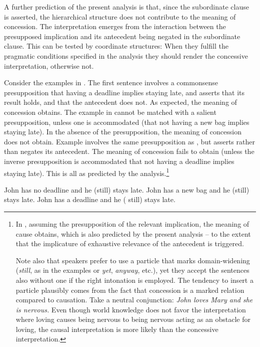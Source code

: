 \documentclass[output=paper]{langscibook}
\begin{document}
\noindent A further prediction of the present analysis is that, since the subordinate clause is asserted, the hierarchical structure does not contribute to the meaning of concession. The interpretation emerges from the interaction between the presupposed implication and its antecedent being negated in the subordinate clause. This can be tested by coordinate structures: When they fulfill the pragmatic conditions
specified in the analysis they should render the concessive interpretation, otherwise not.

Consider the examples in . The first sentence involves a commonsense presupposition that having a deadline implies staying late, and asserts that its result holds, and that the antecedent does not. As expected, the meaning of concession obtains. The example in  cannot be matched with a salient presupposition, unless one is accommodated (that not having a new bag implies staying late). In the absence of the presupposition, the meaning of concession does not obtain. Example  involves the same presupposition as , but asserts rather than negates its antecedent. The meaning of concession fails to obtain (unless the inverse presupposition is accommodated that not having a deadline implies staying late). This is all as predicted by the analysis.\footnote{In , assuming the presupposition of the relevant implication, the meaning of cause obtains, which is also predicted by the present analysis -- to the extent that the implicature of exhaustive relevance of the antecedent is triggered.

Note also that speakers prefer to use a particle that marks domain-widening (\textit{still}, as in the examples or \textit{yet}, \textit{anyway}, etc.), yet they accept the sentences also without one if the right intonation is employed. The tendency to insert a particle plausibly comes from the fact that concession is a marked relation compared to causation. Take a neutral conjunction: \textit{John loves Mary and she is nervous.} Even though world knowledge does not favor the interpretation where loving causes being nervous to being nervous acting as an obstacle for loving, the causal interpretation is more likely than the concessive interpretation.}

\ea\label{ex:ConcTest}
\ea John has no deadline and he (still) stays late.\label{ex:ConcTest-a}
\ex John has a new bag and he (still) stays late.\label{ex:ConcTest-b}
\ex John has a deadline and he (\minsp{\#} still) stays late.\label{ex:ConcTest-c}
\z\z
\end{document}
